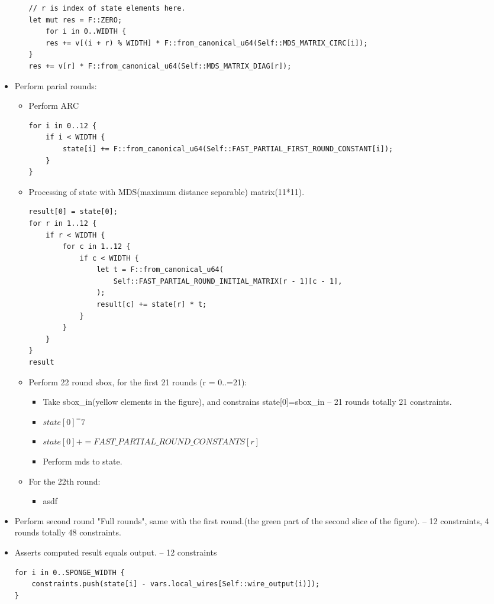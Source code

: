 \begin{itemize}
\begin{itemize}
\begin{lstlisting}
// r is index of state elements here.
let mut res = F::ZERO;
    for i in 0..WIDTH {
    res += v[(i + r) % WIDTH] * F::from_canonical_u64(Self::MDS_MATRIX_CIRC[i]);
}
res += v[r] * F::from_canonical_u64(Self::MDS_MATRIX_DIAG[r]);
        \end{lstlisting}
    \end{itemize}
    \item Perform parial rounds:
    \begin{itemize}
        \item Perform ARC
        \begin{lstlisting}
for i in 0..12 {
    if i < WIDTH {
        state[i] += F::from_canonical_u64(Self::FAST_PARTIAL_FIRST_ROUND_CONSTANT[i]);
    }
}
        \end{lstlisting}
        \item Processing of state with MDS(maximum distance separable) matrix(11*11).
        \begin{lstlisting}
result[0] = state[0];
for r in 1..12 {
    if r < WIDTH {
        for c in 1..12 {
            if c < WIDTH {
                let t = F::from_canonical_u64(
                    Self::FAST_PARTIAL_ROUND_INITIAL_MATRIX[r - 1][c - 1],
                );
                result[c] += state[r] * t;
            }
        }
    }
}
result
        \end{lstlisting}
        \item Perform 22 round sbox, for the first 21 rounds (r = 0..=21):
        \begin{itemize}
            \item Take sbox\_in(yellow elements in the figure), and constrains state[0]=sbox\_in -- 21 rounds totally 21 constraints.
            \item $state[0]^=7$
            \item $state[0] += FAST\_PARTIAL\_ROUND\_CONSTANTS[r]$
            \item Perform mds to state.
        \end{itemize}
        \item For the 22th round:
        \begin{itemize}
            \item asdf
        \end{itemize}
    \end{itemize}
    \item Perform second round "Full rounds", same with the first round.(the green part of the second slice of the figure). -- 12 constraints, 4 rounds totally 48 constraints.
    \item Asserts computed result equals output. -- 12 constraints
    \begin{lstlisting}
for i in 0..SPONGE_WIDTH {
    constraints.push(state[i] - vars.local_wires[Self::wire_output(i)]);
}
    \end{lstlisting}
\end{itemize}
